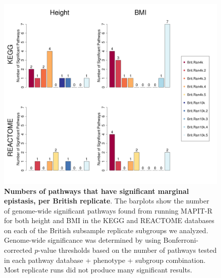 \documentclass[12pt,a4paper]{article}
\begin{document}
\clearpage
\setlength{\footskip}{1cm}

\begin{figure}[htbp]
\centering
\hspace*{-1.75cm}
\includegraphics[scale=.45]{Images/Supp/InterPath_Supp_Figure_BritReps_Barplot_vs4.png}
\caption[TBD]{\textbf{Numbers of pathways that have significant marginal epistasis, per British replicate}. The barplots show the number of genome-wide significant pathways found from running MAPIT-R for both height and BMI in the KEGG and REACTOME databases on each of the British subsample replicate subgroups we analyzed. Genome-wide significance was determined by using Bonferroni-corrected $p$-value thresholds based on the number of pathways tested in each pathway database + phenotype + subgroup combination. Most replicate runs did not produce many significant results.}
\label{InterPath-Supp-Figure-BritReps-Barplots}
\end{figure}
\clearpage
\end{document}
